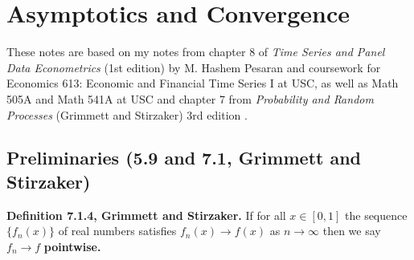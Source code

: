 %
%
%
%
%
%
%
%
%
%
%
%
%
%

\section{Asymptotics and Convergence}

These notes are based on my notes from chapter 8 of \textit{Time Series and Panel Data Econometrics} (1st edition) by M. Hashem Pesaran \citep{pesaran-2015-text} and coursework for Economics 613: Economic and Financial Time Series I at USC, as well as Math 505A and Math 541A at USC and chapter 7 from \textit{Probability and Random Processes} (Grimmett and Stirzaker) 3rd edition \citep{grimmett2001probability}.


\subsection{Preliminaries (5.9 and 7.1, Grimmett and Stirzaker)}
\label{asym.preliminaries}

\begin{definition} \textbf{Definition 7.1.4, Grimmett and Stirzaker.} If for all \(x \in [0, 1]\) the sequence \(\{f_n(x)\}\) of real numbers satisfies \(f_n(x) \to f(x)\) as \(n \to \infty\) then we say \(f_n \to f\) \textbf{pointwise.}
\end{definition} 

